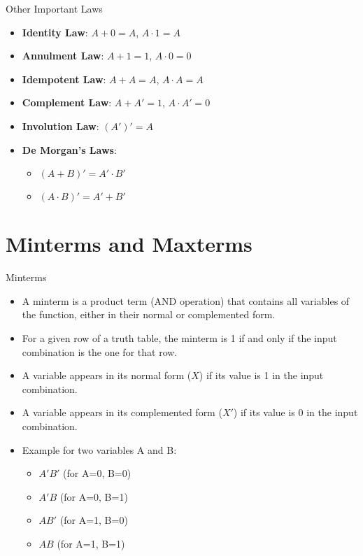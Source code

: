 \documentclass{beamer}
\begin{document}
\begin{frame}{Other Important Laws}
    \begin{itemize}
        \item \textbf{Identity Law}: $A + 0 = A$, $A \cdot 1 = A$
        \item \textbf{Annulment Law}: $A + 1 = 1$, $A \cdot 0 = 0$
        \item \textbf{Idempotent Law}: $A + A = A$, $A \cdot A = A$
        \item \textbf{Complement Law}: $A + A' = 1$, $A \cdot A' = 0$
        \item \textbf{Involution Law}: $(A')' = A$
        \item \textbf{De Morgan's Laws}:
              \begin{itemize}
                \item $(A + B)' = A' \cdot B'$
                \item $(A \cdot B)' = A' + B'$
              \end{itemize}
    \end{itemize}
\end{frame}


\section{Minterms and Maxterms}

\begin{frame}{Minterms}
    \begin{itemize}
        \item A minterm is a product term (AND operation) that contains all variables of the function, either in their normal or complemented form.
        \item For a given row of a truth table, the minterm is 1 if and only if the input combination is the one for that row.
        \item A variable appears in its normal form ($X$) if its value is 1 in the input combination.
        \item A variable appears in its complemented form ($X'$) if its value is 0 in the input combination.
        \item Example for two variables A and B:
            \begin{itemize}
                \item $A'B'$ (for A=0, B=0)
                \item $A'B$ (for A=0, B=1)
                \item $AB'$ (for A=1, B=0)
                \item $AB$ (for A=1, B=1)
            \end{itemize}
    \end{itemize}
\end{frame}
\end{document}
